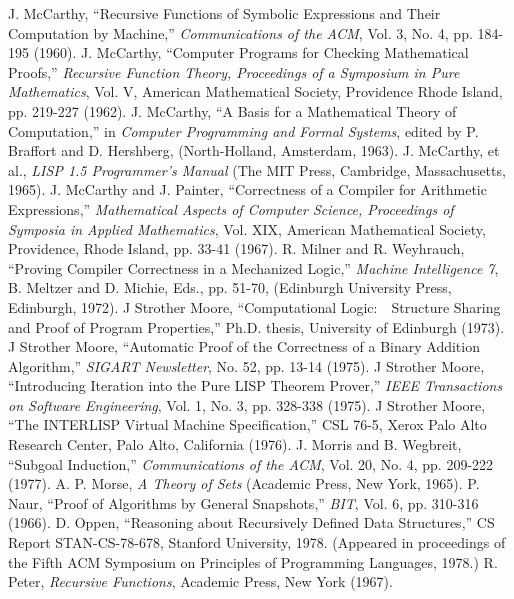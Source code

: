 \documentclass[10pt]{book}
\begin{document}
\begin{thebibliography}{99}
 J. McCarthy, ``Recursive Functions of Symbolic Expressions and Their Computation by Machine,'' \emph{Communications of the ACM}, Vol. 3, No. 4, pp. 184-195 (1960).
 J. McCarthy, ``Computer Programs for Checking Mathematical Proofs,'' \emph{Recursive Function Theory, Proceedings of a Symposium in Pure Mathematics}, Vol. V, American Mathematical Society, Providence Rhode Island, pp. 219-227 (1962).
 J. McCarthy, ``A Basis for a Mathematical Theory of Computation,'' in \emph{Computer Programming and Formal Systems}, edited by P. Braffort and D. Hershberg, (North-Holland, Amsterdam, 1963).
 J. McCarthy, et al., \emph{LISP 1.5 Programmer's Manual} (The MIT Press, Cambridge, Massachusetts, 1965).
 J. McCarthy and J. Painter, ``Correctness of a Compiler for Arithmetic Expressions,'' \emph{Mathematical Aspects of Computer Science, Proceedings of Symposia in Applied Mathematics},  Vol. XIX, American Mathematical Society, Providence, Rhode Island, pp. 33-41 (1967).
 R. Milner and R. Weyhrauch, ``Proving Compiler Correctness in a Mechanized Logic,'' \emph{Machine Intelligence 7}, B. Meltzer and D. Michie, Eds., pp. 51-70, (Edinburgh University Press, Edinburgh, 1972).
 J Strother Moore, ``Computational Logic:~~Structure Sharing and Proof of Program Properties,'' Ph.D. thesis, University of Edinburgh (1973).
 J Strother Moore, ``Automatic Proof of the Correctness of a Binary Addition Algorithm,'' \emph{SIGART Newsletter}, No. 52, pp. 13-14 (1975).
 J Strother Moore, ``Introducing Iteration into the Pure LISP Theorem Prover,'' \emph{IEEE Transactions on Software Engineering}, Vol. 1, No. 3, pp. 328-338 (1975).
 J Strother Moore, ``The INTERLISP Virtual Machine Specification,'' CSL 76-5, Xerox Palo Alto Research Center, Palo Alto, California (1976).
 J. Morris and B. Wegbreit, ``Subgoal Induction,'' \emph{Communications of the ACM}, Vol. 20, No. 4, pp. 209-222 (1977).
 A. P. Morse, \emph{A Theory of Sets} (Academic Press, New York, 1965).
 P. Naur, ``Proof of Algorithms by General Snapshots,'' \emph{BIT}, Vol. 6, pp. 310-316 (1966).
 D. Oppen, ``Reasoning about Recursively Defined Data Structures,'' CS Report STAN-CS-78-678, Stanford University, 1978. (Appeared in proceedings  of the Fifth ACM Symposium on Principles of Programming Languages, 1978.) 
 R. Peter, \emph{Recursive Functions}, Academic Press, New York (1967).

\end{thebibliography}
\end{document}
